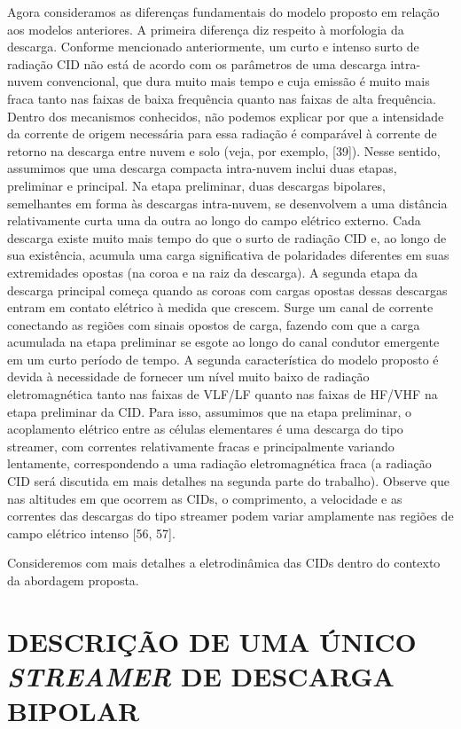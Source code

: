 \documentclass[a4paper, 12pt, onecolumn,singlespacing]{article}
\begin{document}
	Agora consideramos as diferenças fundamentais do modelo proposto em relação aos modelos anteriores. A primeira diferença diz respeito à morfologia da descarga. Conforme mencionado anteriormente, um curto e intenso surto de radiação CID não está de acordo com os parâmetros de uma descarga intra-nuvem convencional, que dura muito mais tempo e cuja emissão é muito mais fraca tanto nas faixas de baixa frequência quanto nas faixas de alta frequência. Dentro dos mecanismos conhecidos, não podemos explicar por que a intensidade da corrente de origem necessária para essa radiação é comparável à corrente de retorno na descarga entre nuvem e solo (veja, por exemplo, [39]). Nesse sentido, assumimos que uma descarga compacta intra-nuvem inclui duas etapas, preliminar e principal. Na etapa preliminar, duas descargas bipolares, semelhantes em forma às descargas intra-nuvem, se desenvolvem a uma distância relativamente curta uma da outra ao longo do campo elétrico externo. Cada descarga existe muito mais tempo do que o surto de radiação CID e, ao longo de sua existência, acumula uma carga significativa de polaridades diferentes em suas extremidades opostas (na coroa e na raiz da descarga). A segunda etapa da descarga principal começa quando as coroas com cargas opostas dessas descargas entram em contato elétrico à medida que crescem. Surge um canal de corrente conectando as regiões com sinais opostos de carga, fazendo com que a carga acumulada na etapa preliminar se esgote ao longo do canal condutor emergente em um curto período de tempo. A segunda característica do modelo proposto é devida à necessidade de fornecer um nível muito baixo de radiação eletromagnética tanto nas faixas de VLF/LF quanto nas faixas de HF/VHF na etapa preliminar da CID. Para isso, assumimos que na etapa preliminar, o acoplamento elétrico entre as células elementares é uma descarga do tipo streamer, com correntes relativamente fracas e principalmente variando lentamente, correspondendo a uma radiação eletromagnética fraca (a radiação CID será discutida em mais detalhes na segunda parte do trabalho). Observe que nas altitudes em que ocorrem as CIDs, o comprimento, a velocidade e as correntes das descargas do tipo streamer podem variar amplamente nas regiões de campo elétrico intenso [56, 57].
	
	Consideremos com mais detalhes a eletrodinâmica das CIDs dentro do contexto da abordagem proposta.
	
	\section{DESCRIÇÃO DE UMA ÚNICO \textit{STREAMER} DE DESCARGA BIPOLAR}
	
\end{document}
